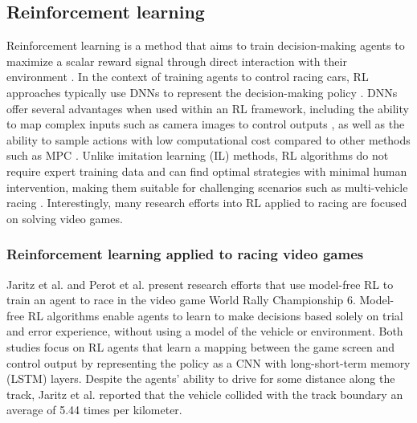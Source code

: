 \subsection{Reinforcement learning}
\label{sec:reinforcement_learning}
Reinforcement learning is a method that aims to train decision-making agents to maximize a scalar reward signal through direct interaction with their environment \cite{Plaat_2022}. 
In the context of training agents to control racing cars, RL approaches typically use DNNs to represent the decision-making policy \cite{Betz2021}. 
DNNs offer several advantages when used within an RL framework, including the ability to map complex inputs such as camera images to control outputs \cite{hsu2022, Schwarting2021, Jaritz2018, Perot2017}, as well as the ability to sample actions with low computational cost compared to other methods such as MPC \cite{Ghignone2022}. 
Unlike imitation learning (IL) methods, RL algorithms do not require expert training data and can find optimal strategies with minimal human intervention, making them suitable for challenging scenarios such as multi-vehicle racing \cite{Song2021, Wurman2022}. 
Interestingly, many research efforts into RL applied to racing are focused on solving video games.

\subsubsection*{Reinforcement learning applied to racing video games}

Jaritz et al. \cite{Jaritz2018} and Perot et al. \cite{Perot2017} present research efforts that use model-free RL to train an agent to race in the video game World Rally Championship $6$. 
Model-free RL algorithms enable agents to learn to make decisions based solely on trial and error experience, without using a model of the vehicle or environment.
Both studies focus on RL agents that learn a mapping between the game screen and control output by representing the policy as a CNN with long-short-term memory (LSTM) layers. 
Despite the agents' ability to drive for some distance along the track, Jaritz et al. \cite{Jaritz2018} reported that the vehicle collided with the track boundary an average of 5.44 times per kilometer.

